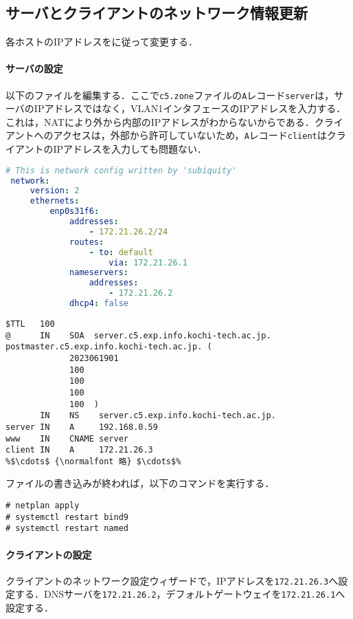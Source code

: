\subsection{サーバとクライアントのネットワーク情報更新}
各ホストのIPアドレスをに従って変更する．
\paragraph{サーバの設定}
以下のファイルを編集する．ここで\texttt{c5.zone}ファイルの\texttt{A}レコード\texttt{server}は，サーバのIPアドレスではなく，VLAN1インタフェースのIPアドレスを入力する．
これは，NATにより外から内部のIPアドレスがわからないからである．クライアントへのアクセスは，外部から許可していないため，\texttt{A}レコード\texttt{client}はクライアントのIPアドレスを入力しても問題ない．
\begin{lstlisting}[language=yaml,style=file,caption={\ttfamily /etc/netplan/00-install-config.yaml}]
 # This is network config written by 'subiquity'
 network:
     version: 2
     ethernets:
         enp0s31f6:
             addresses:
                 - 172.21.26.2/24
             routes:
                 - to: default
                     via: 172.21.26.1
             nameservers:
                 addresses:
                     - 172.21.26.2
             dhcp4: false
\end{lstlisting}
\begin{lstlisting}[style=file,language=dns,caption={\ttfamily /etc/bind/c5.zone}]
$TTL   100
@      IN    SOA  server.c5.exp.info.kochi-tech.ac.jp. postmaster.c5.exp.info.kochi-tech.ac.jp. (
             2023061901
             100
             100
             100
             100  )
       IN    NS    server.c5.exp.info.kochi-tech.ac.jp.
server IN    A     192.168.0.59
www    IN    CNAME server
client IN    A     172.21.26.3
%$\cdots$ {\normalfont 略} $\cdots$%
\end{lstlisting}
ファイルの書き込みが終われば，以下のコマンドを実行する．
\begin{lstlisting}
# netplan apply
# systemctl restart bind9
# systemctl restart named
\end{lstlisting}
\paragraph{クライアントの設定}
クライアントのネットワーク設定ウィザードで，IPアドレスを\texttt{172.21.26.3}へ設定する．DNSサーバを\texttt{172.21.26.2}，デフォルトゲートウェイを\texttt{172.21.26.1}へ設定する．
